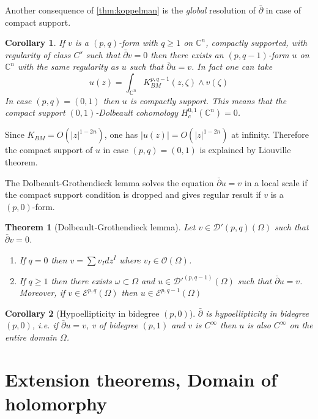 \documentclass[11pt]{article}
\newtheorem{theorem}{Theorem}
\newtheorem{corollary}{Corollary}[theorem]
\begin{document}
Another consequence of \ref{thm:koppelman} is the \emph{global} resolution of \(\bar \partial\)
in case of compact support.

\begin{corollary}
If \(v\) is a \((p,q)\)-form with \(q\geq 1\) on \(\mathbb{C}^n\), compactly supported, with regularity of class \(C^s\) such that \(\bar \partial v = 0\) then
there exists an \((p,q-1)\)-form \(u\) on \(\mathbb{C}^n\) with the same regularity
as \(u\) such
that \(\bar \partial u =v\). In fact one can take
\[
u(z) = \int_{\mathbb{C}^n} K_{BM}^{p,q-1}(z,\zeta)\wedge v(\zeta)
\]
In case \((p,q)=(0,1)\) then \(u\) is compactly support. This means that the compact
support \((0,1)\)-Dolbeault cohomology \(H_c^{0,1}(\mathbb{C}^n) = 0\).
\end{corollary}

Since \(K_{BM} = O(|z|^{1-2n})\), one has \(|u(z)| = O(|z|^{1-2n})\) at
infinity. Therefore the compact support of \(u\) in case \((p,q)=(0,1)\) is explained
by Liouville theorem.


The Dolbeault-Grothendieck lemma solves the equation \(\bar \partial u = v\) in a local
scale if the compact support condition is dropped and gives regular result if \(v\) is a \((p,0)\)-form.

\begin{theorem}[Dolbeault-Grothendieck lemma]
\label{thm:dolbeault-grothendieck}
Let \(v \in \mathcal{D}'(p,q)(\Omega)\) such that \(\bar \partial v = 0\).
\begin{enumerate}
\item If \(q=0\) then \(v = \sum v_I dz^I\) where \(v_I\in \mathcal{O}(\Omega)\).
\item If \(q \geq 1\) then there exists \(\omega\subset \Omega\) and \(u\in
   \mathcal{D}'^(p,q-1)(\Omega)\) such that \(\bar \partial u =v\). Moreover, if \(v\in
   \mathcal{E}^{p,q}(\Omega)\) then \(u\in \mathcal{E}^{p,q-1}(\Omega)\)
\end{enumerate}
\end{theorem}

\begin{corollary}[Hypoellipticity in bidegree \((p,0)\)]
\(\bar \partial\) is hypoellipticity in bidegree \((p,0)\), i.e. if \(\bar \partial u
= v\), v of bidegree \((p,1)\) and \(v\) is \(C^\infty\) then \(u\) is also \(C^\infty\) on the entire domain \(\Omega\).
\end{corollary}


\section{Extension theorems, Domain of holomorphy}
\label{sec:org36f7626}
\end{document}
